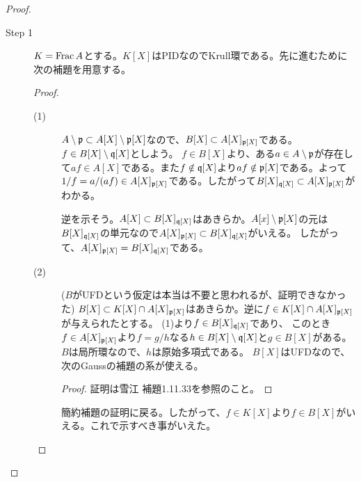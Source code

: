 \begin{proof} ${}$
  \begin{description}
\item[Step 1] $K = \operatorname{Frac} A$とする。$K[X]$はPIDなのでKrull環である。先に進むために次の補題を用意する。
\begin{proof} ${}$
  \begin{description}
\item[(1)] $A \setminus  \mathfrak{p} \subset A[X] \setminus  \mathfrak{p}[X]$なので、$B[X] \subset A[X]_{\mathfrak{p}[X]} $である。$f \in B[X] \setminus \mathfrak{q}[X]$としよう。
$f \in B[X]$より、ある$a \in A \setminus \mathfrak{p}$が存在して$af \in A[X]$である。また$f \notin \mathfrak{q}[X]$より$af \notin \mathfrak{p}[X]$である。よって
$1/f = a / (af) \in A[X]_{\mathfrak{p}[X]}$である。したがって$B[X]_{\mathfrak{q}[X]} \subset A[X]_{\mathfrak{p}[X]}$がわかる。

逆を示そう。$A[X] \subset B[X]_{\mathfrak{q}[X]}$はあきらか。$A[x] \setminus \mathfrak{p}[X]$の元は$B[X]_{\mathfrak{q}[X]}$の単元なので$A[X]_{\mathfrak{p}[X]} \subset B[X]_{\mathfrak{q}[X]}$がいえる。
したがって、$A[X]_{\mathfrak{p}[X]} = B[X]_{\mathfrak{q}[X]}$である。
\item[(2)] ($B$がUFDという仮定は本当は不要と思われるが、証明できなかった) $B[X] \subset K[X] \cap A[X]_{\mathfrak{p}[X]}$はあきらか。逆に$f \in K[X] \cap A[X]_{\mathfrak{p}[X]}$が与えられたとする。
(1)より$f \in B[X]_{\mathfrak{q}[X]}$であり、
このとき$f \in A[X]_{\mathfrak{p}[X]}$より$f = g/h$なる$h \in B[X] \setminus \mathfrak{q}[X]$と$g \in B[X]$がある。$B$は局所環なので、$h$は原始多項式である。
$B[X]$はUFDなので、次のGaussの補題の系が使える。
\begin{proof}
  証明は雪江\cite{雪江2} 補題1.11.33を参照のこと。
\end{proof}
簡約補題の証明に戻る。したがって、$f \in K[X]$より$f \in B[X]$がいえる。これで示すべき事がいえた。

  \end{description}
\end{proof}
  \end{description}
\end{proof}
